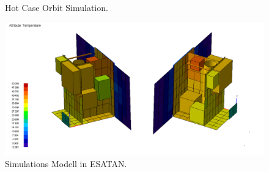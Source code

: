 \documentclass[twoside]{article}
\begin{document}
\begin{multicols}{2}
\begin{figure}[H]
            \caption{Hot Case Orbit Simulation.}
            \label{fig:hotcase}
         \end{figure}
         \begin{figure}[H]
            \captionsetup{format=plain}
            \centering
            \includegraphics[width=\linewidth]{esatanmodell.png}       
            \caption{Simulations Modell in ESATAN.}
            \label{fig:esatan}
         \end{figure}


\end{multicols}
\end{document}
